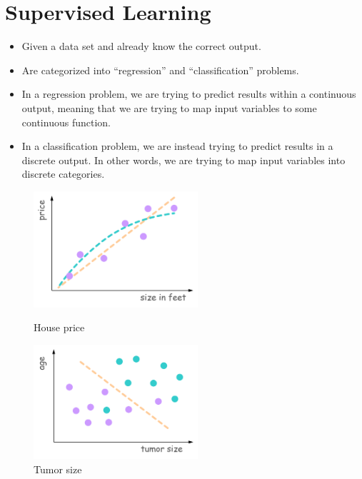\section{Supervised Learning}
\begin{itemize} 
    \item Given a data set and already know the correct output. 
    \item Are categorized into ``regression'' and ``classification'' problems. 
    \item In a regression problem, we are trying to predict results within a continuous output, meaning that we are trying to map input variables to some continuous function.
    \item In a classification problem, we are instead trying to predict results in a discrete output. In other words, we are trying to map input variables into discrete categories. 
\end{itemize}
\begin{figure}[!htbp]
    \begin{minipage}[t]{0.5\textwidth}
        \centering
        \includegraphics[width=2.4in]{./images/house_price.png}
        \caption{House price}
    \end{minipage}
    \begin{minipage}[t]{0.45\textwidth}
        \centering
        \includegraphics[width=2.4in]{./images/tumor_size.png}
        \caption{Tumor size}
    \end{minipage}
\end{figure}


